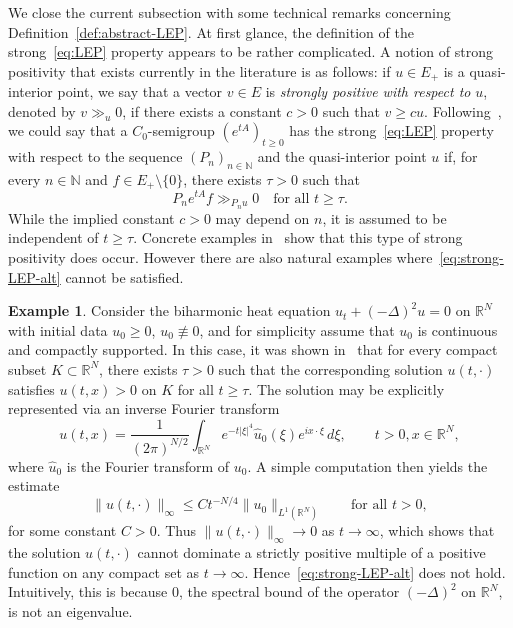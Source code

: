 \documentclass[a4paper, reqno]{amsart}
\numberwithin{equation}{section}
\theoremstyle{plain}
\theoremstyle{definition}
\newtheorem{example}[theorem]{Example}
\theoremstyle{remark}
\newcommand{\NN}{\mathbb{N}}
\newcommand{\RR}{\mathbb{R}}
\begin{document}
We close the current subsection with some technical remarks concerning Definition~\ref{def:abstract-LEP}. At first glance, the definition of the strong~\eqref{eq:LEP} property appears to be rather complicated. A notion of strong positivity that exists currently in the literature is as follows: if $u\in E_+$ is a quasi-interior point, we say that a vector $v\in E$ is \emph{strongly positive with respect to} $u$, denoted by $v\gg_u 0$, if there exists a constant $c>0$ such that $v\ge cu$. Following~\cite[Definition 2.4]{Ar21}, we could say that a $C_0$-semigroup $(e^{tA})_{t\ge 0}$ has the strong~\eqref{eq:LEP} property with respect to the sequence $(P_n)_{n\in\NN}$ and the quasi-interior point $u$ if, for every $n\in\NN$ and $f\in E_+\setminus\{0\}$, there exists $\tau>0$ such that
\begin{equation}
	\label{eq:strong-LEP-alt}
	P_n e^{tA}f \gg_{P_n u} 0 \quad\text{for all }t\ge\tau.
\end{equation}
While the implied constant $c>0$ may depend on $n$, it is assumed to be independent of $t\ge\tau$. Concrete examples in~\cite[Section 5]{Ar21} show that this type of strong positivity does occur. However there are also natural examples where~\eqref{eq:strong-LEP-alt} cannot be satisfied.
\begin{example}
	Consider the biharmonic heat equation $u_t + (-\Delta)^2 u=0$ on $\RR^N$ with initial data $u_0\ge 0$, $u_0\not\equiv 0$, and for simplicity assume that $u_0$ is continuous and compactly supported. In this case, it was shown in~\cite{GG-lep} that for every compact subset $K\subset\RR^N$, there exists $\tau>0$ such that the corresponding solution $u(t,\cdot)$ satisfies $u(t,x)>0$ on $K$ for all $t\ge\tau$. The solution may be explicitly represented via an inverse Fourier transform
	\begin{equation*}
		u(t,x) = \frac{1}{(2\pi)^{N/2}}\int_{\RR^N} e^{-t|\xi|^4}\hat{u}_0(\xi)e^{ix\cdot\xi} \,d\xi, \qquad t>0, x\in\RR^N,
	\end{equation*}
	where $\hat{u}_0$ is the Fourier transform of $u_0$. A simple computation then yields the estimate
	\begin{equation*}
		\|u(t,\cdot)\|_\infty \le C t^{-N/4} \|u_0\|_{L^1(\RR^N)}\qquad\text{for all }t>0,
	\end{equation*}
	for some constant $C>0$. Thus $\|u(t,\cdot)\|_\infty \to 0$ as $t\to\infty$, which shows that the solution $u(t,\cdot)$ cannot dominate a strictly positive multiple of a positive function on any compact set as $t\to\infty$. Hence~\eqref{eq:strong-LEP-alt} does not hold. Intuitively, this is because $0$, the spectral bound of the operator $(-\Delta)^2$ on $\RR^N$, is not an eigenvalue.
\end{example}
\end{document}
